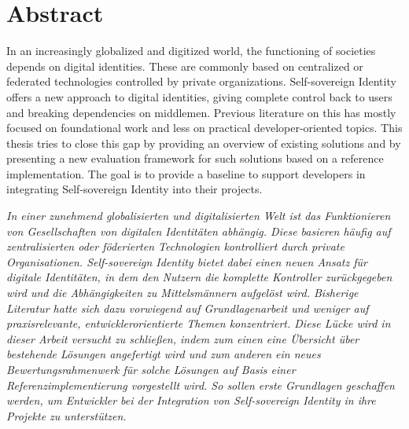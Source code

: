 \chapter*{Abstract}

In an increasingly globalized and digitized world, the functioning of societies depends on digital identities. These are commonly based on centralized or federated technologies controlled by private organizations. Self-sovereign Identity offers a new approach to digital identities, giving complete control back to users and breaking dependencies on middlemen. Previous literature on this has mostly focused on foundational work and less on practical developer-oriented topics. This thesis tries to close this gap by providing an overview of existing solutions and by presenting a new evaluation framework for such solutions based on a reference implementation. The goal is to provide a baseline to support developers in integrating Self-sovereign Identity into their projects.

\textit{In einer zunehmend globalisierten und digitalisierten Welt ist das Funktionieren von Gesellschaften von digitalen Identitäten abhängig. Diese basieren häufig auf zentralisierten oder föderierten Technologien kontrolliert durch private Organisationen. Self-sovereign Identity bietet dabei einen neuen Ansatz für digitale Identitäten, in dem den Nutzern die komplette Kontroller zurückgegeben wird und die Abhängigkeiten zu Mittelsmännern aufgelöst wird. Bisherige Literatur hatte sich dazu vorwiegend auf Grundlagenarbeit und weniger auf praxisrelevante, entwicklerorientierte Themen konzentriert. Diese Lücke wird in dieser Arbeit versucht zu schließen, indem zum einen eine Übersicht über bestehende Lösungen angefertigt wird und zum anderen ein neues Bewertungsrahmenwerk für solche Lösungen auf Basis einer Referenzimplementierung vorgestellt wird. So sollen erste Grundlagen geschaffen werden, um Entwickler bei der Integration von Self-sovereign Identity in ihre Projekte zu unterstützen.}

